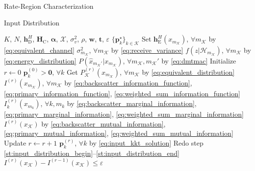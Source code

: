 \documentclass[journal]{IEEEtran}
\begin{document}
\begin{section}{Rate-Region Characterization}
\begin{subsection}{Input Distribution}
		\begin{algorithm}[!t]
			\caption{Numerical \gls{kkt} Input Distribution Evaluation by Limits of Sequence}
			\label{al:input_distribution}
			\begin{algorithmic}[1]
				\Require $K$, $N$, $\boldsymbol{h}_{\mathrm{D}}^H$, $\boldsymbol{H}_{\mathrm{C}}$, $\boldsymbol{\alpha}$, $\mathcal{X}$, $\sigma_v^2$, $\rho$, $\boldsymbol{w}$, $\boldsymbol{t}$, $\varepsilon$
				\Ensure $\{\boldsymbol{p}_k^\star\}_{k \in \mathcal{K}}$
				\State Set $\boldsymbol{h}_{\mathrm{E}}^H(x_{m_{\mathcal{K}}})$, $\forall m_{\mathcal{K}}$ by \eqref{eq:equivalent_channel}
				\State \phantom{Set} $\sigma^2_{m_{\mathcal{K}}}$, $\forall m_{\mathcal{K}}$ by \eqref{eq:receive_variance}
				\State \phantom{Set} $f(z|\mathcal{H}_{m_{\mathcal{K}}})$, $\forall m_{\mathcal{K}}$ by \eqref{eq:energy_distribution}
				\State \phantom{Set} $P(\hat{x}_{m_{\mathcal{K}}'}|x_{m_{\mathcal{K}}})$, $\forall m_{\mathcal{K}}, m_{\mathcal{K}}'$ by \eqref{eq:dmtmac}
				\State Initialize $r \gets 0$
				\State \phantom{Initialize} $\boldsymbol{p}_k^{(0)} > \boldsymbol{0}$, $\forall k$
				\State Get $P_{\mathcal{K}}^{(r)}(x_{m_{\mathcal{K}}})$, $\forall m_{\mathcal{K}}$ by \eqref{eq:equivalent_distribution} \label{st:input_distribution_begin}
				\State \phantom{Get} $I^{(r)}(x_{m_{\mathcal{K}}})$, $\forall m_{\mathcal{K}}$ by \eqref{eq:backscatter_information_function}, \eqref{eq:primary_information_function}, \eqref{eq:weighted_sum_information_function}
				\State \phantom{Get} $I^{(r)}_k(x_{m_k})$, $\forall k,m_k$ by \eqref{eq:backscatter_marginal_information}, \eqref{eq:primary_marginal_information}, \eqref{eq:weighted_sum_marginal_information}
				\State \phantom{Get} $I^{(r)}(x_{\mathcal{K}})$ by \eqref{eq:backscatter_mutual_information}, \eqref{eq:primary_mutual_information}, \eqref{eq:weighted_sum_mutual_information} \label{st:input_distribution_end}
				\Repeat
					\State Update $r \gets r+1$
					\State \phantom{Update} $\boldsymbol{p}_k^{(r)}$, $\forall k$ by \eqref{eq:input_kkt_solution}
					\State Redo step \ref{st:input_distribution_begin}--\ref{st:input_distribution_end}
				\Until $I^{(r)}(x_{\mathcal{K}}) - I^{(r-1)}(x_{\mathcal{K}}) \le \varepsilon$
			\end{algorithmic}
		\end{algorithm}
	\end{subsection}


\end{section}
\end{document}
